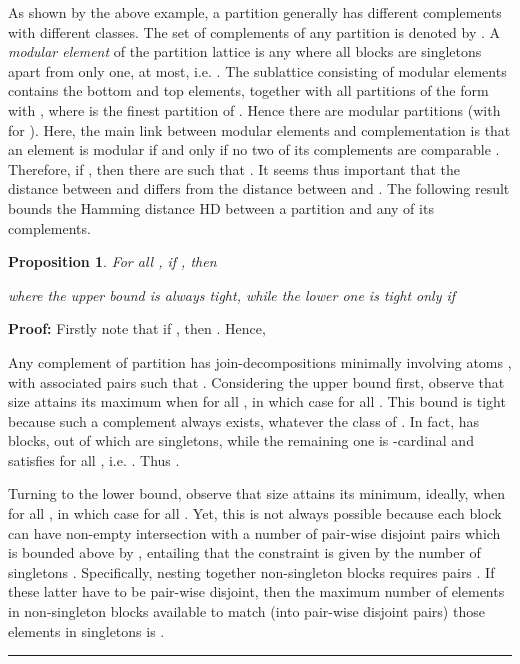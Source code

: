 \documentclass[a4paper,10pt]{article}
\newtheorem{proposition}[theorem]{Proposition}
\newenvironment{proof}[1][Proof]{\noindent\textbf{#1: }}{\ \rule{0.5em}{0.5em}}
\begin{document}
As shown by the above example, a partition generally has different complements with different classes. The set of complements of any partition  is denoted by
.
A \textit{modular element} of the partition lattice \cite{Aigner79,Stanley1971,Stern99} is any  where all blocks are singletons apart from only one, at most,
i.e. . The sublattice  consisting of modular elements contains the bottom and top elements, together with
all partitions of the form  with , where  is the finest partition of . Hence there are  modular partitions (with
 for ).
Here, the main link between modular elements and complementation is that an element is modular if and only if no two of its complements are comparable
\cite[Theorem 1]{Stanley1971}. Therefore, if , then there are  such that . It seems thus important that the distance
between  and  differs from the distance between  and . The following result bounds the Hamming distance HD between a partition and any of its complements. 

\begin{proposition}
For all , if , then

where the upper bound is always tight, while the lower one is tight only if

\end{proposition}

\begin{proof}
Firstly note that if , then . Hence,

Any complement of partition  has join-decompositions minimally involving  atoms , with
associated pairs  such that . Considering the upper bound first, observe that size
 attains its maximum when  for all , in which case
 for all . This bound is tight because such a complement  always exists, whatever
the class  of . In fact,  has  blocks, out of which  are singletons, while the remaining one  is -cardinal and
satisfies  for all , i.e. . Thus .

Turning to the lower bound, observe that size  attains its minimum, ideally, when  for all
, in which case  for all . Yet, this is not always possible because each block  can have non-empty
intersection with a number of pair-wise disjoint pairs  which is bounded above by , entailing that the constraint is given by the number 
of singletons . Specifically, nesting together  non-singleton blocks requires  pairs . If these latter
have to be pair-wise disjoint, then the maximum number of elements  in non-singleton blocks available to match (into pair-wise disjoint pairs) those elements
 in singletons is .
\end{proof}
\end{document}
